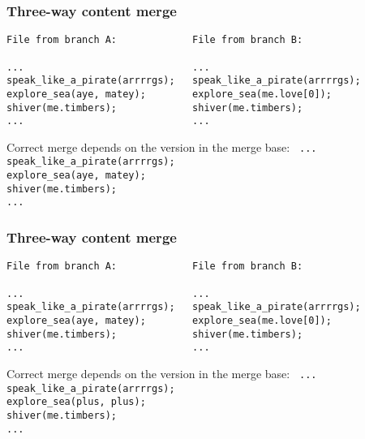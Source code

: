 \documentclass[t]{beamer}
\begin{document}
\begin{frame}[containsverbatim]
  \frametitle{Three-way content merge}

  {\footnotesize
  \begin{verbatim}
File from branch A:             File from branch B:

...                             ...                             
speak_like_a_pirate(arrrrgs);   speak_like_a_pirate(arrrrgs);   
explore_sea(aye, matey);        explore_sea(me.love[0]);
shiver(me.timbers);             shiver(me.timbers);             
...                             ...
  \end{verbatim}
  }

  \vspace*{-1.2em}
  Correct merge depends on the version in the merge base:
  {\footnotesize
  \texttt{
...\\
speak\_like\_a\_pirate(arrrrgs);\\
{\color{red}explore\_sea(aye, matey);}\\
shiver(me.timbers);\\
...
  }}
  
\end{frame}

\begin{frame}[containsverbatim]
  \frametitle{Three-way content merge}

  {\footnotesize
  \begin{verbatim}
File from branch A:             File from branch B:

...                             ...                             
speak_like_a_pirate(arrrrgs);   speak_like_a_pirate(arrrrgs);   
explore_sea(aye, matey);        explore_sea(me.love[0]);
shiver(me.timbers);             shiver(me.timbers);             
...                             ...
  \end{verbatim}
  }

  \vspace*{-1.2em}
  Correct merge depends on the version in the merge base:
  {\footnotesize
  \texttt{
...\\
speak\_like\_a\_pirate(arrrrgs);\\
{\color{red}explore\_sea(plus, plus);}\\
shiver(me.timbers);\\
...
  }}
  
\end{frame}
\end{document}
